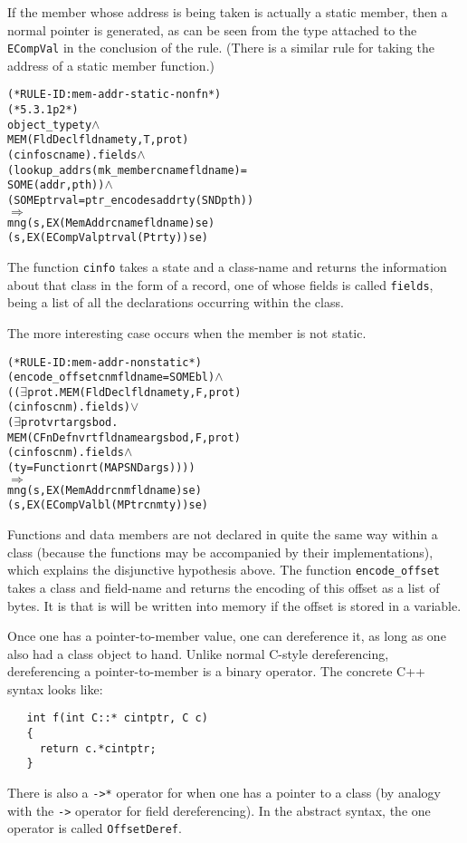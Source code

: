 \documentclass[11pt]{article}
\begin{document}
If the member whose address is being taken is actually a static
member, then a normal pointer is generated, as can be seen from the
type attached to the \texttt{ECompVal} in the conclusion of the rule.
(There is a similar rule for taking the address of a static member
function.)
%
\begin{alltt}
(* RULE-ID: mem-addr-static-nonfn *)
(* 5.3.1 p2 *)
     object_type ty \(\land\)
     MEM (FldDecl fldname ty, T, prot)
         (cinfo s cname).fields \(\land\)
     (lookup_addr s (mk_member cname fldname) =
        SOME (addr, pth)) \(\land\)
     (SOME ptrval = ptr_encode s addr ty (SND pth))
   \(\Rightarrow\)
     mng (s, EX (MemAddr cname fldname) se)
         (s, EX (ECompVal ptrval (Ptr ty)) se)
\end{alltt}
The function \texttt{cinfo} takes a state and a class-name and returns
the information about that class in the form of a record, one of whose
fields is called \texttt{fields}, being a list of all the declarations
occurring within the class.

\bigskip\noindent
The more interesting case occurs when the member is not static.
%
\begin{alltt}
(* RULE-ID: mem-addr-nonstatic *)
     (encode_offset cnm fldname = SOME bl) \(\land\)
     ((\(\exists\)prot. MEM (FldDecl fldname ty, F, prot)
                  (cinfo s cnm).fields) \(\lor\)
      (\(\exists\)prot v rt args bod.
          MEM (CFnDefn v rt fldname args bod, F, prot)
              (cinfo s cnm).fields \(\land\)
          (ty = Function rt (MAP SND args))))
   \(\Rightarrow\)
     mng (s, EX (MemAddr cnm fldname) se)
         (s, EX (ECompVal bl (MPtr cnm ty)) se)
\end{alltt}
Functions and data members are not declared in quite the same way
within a class (because the functions may be accompanied by their
implementations), which explains the disjunctive hypothesis above.
The function \texttt{encode_offset} takes a class and field-name and
returns the encoding of this offset as a list of bytes.  It is that is
will be written into memory if the offset is stored in a variable.

\bigskip\noindent
Once one has a pointer-to-member value, one can dereference it, as
long as one also had a class object to hand.  Unlike normal C-style
dereferencing, dereferencing a pointer-to-member is a binary
operator.  The concrete C++ syntax looks like:
\begin{verbatim}
   int f(int C::* cintptr, C c)
   {
     return c.*cintptr;
   }
\end{verbatim}
There is also a \texttt{->*} operator for when one has a pointer to a
class (by analogy with the \texttt{->} operator for field
dereferencing).  In the abstract syntax, the one operator is called
\texttt{OffsetDeref}.
\end{document}
